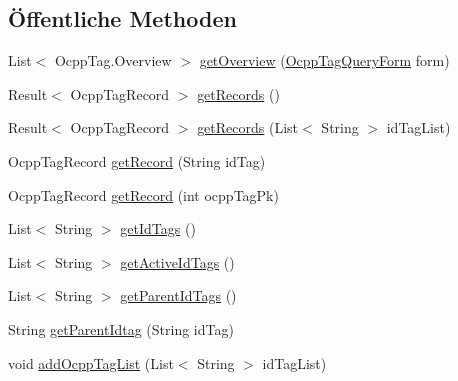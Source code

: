 \subsection*{Öffentliche Methoden}
\begin{DoxyCompactItemize}
\item 
List$<$ Ocpp\+Tag.\+Overview $>$ \hyperlink{interfacede_1_1rwth_1_1idsg_1_1steve_1_1repository_1_1_ocpp_tag_repository_ae80c63f91fbc5c911f0ea3a939406285}{get\+Overview} (\hyperlink{classde_1_1rwth_1_1idsg_1_1steve_1_1web_1_1dto_1_1_ocpp_tag_query_form}{Ocpp\+Tag\+Query\+Form} form)
\item 
Result$<$ Ocpp\+Tag\+Record $>$ \hyperlink{interfacede_1_1rwth_1_1idsg_1_1steve_1_1repository_1_1_ocpp_tag_repository_a3b051f03e81d64f48e5c988a81c86dc7}{get\+Records} ()
\item 
Result$<$ Ocpp\+Tag\+Record $>$ \hyperlink{interfacede_1_1rwth_1_1idsg_1_1steve_1_1repository_1_1_ocpp_tag_repository_aac8b821859efd357c481fab84226f7ca}{get\+Records} (List$<$ String $>$ id\+Tag\+List)
\item 
Ocpp\+Tag\+Record \hyperlink{interfacede_1_1rwth_1_1idsg_1_1steve_1_1repository_1_1_ocpp_tag_repository_a3d218f3abe67946c57af8976c58d206b}{get\+Record} (String id\+Tag)
\item 
Ocpp\+Tag\+Record \hyperlink{interfacede_1_1rwth_1_1idsg_1_1steve_1_1repository_1_1_ocpp_tag_repository_aba9fb2efd7229769c3c198e194eda4dd}{get\+Record} (int ocpp\+Tag\+Pk)
\item 
List$<$ String $>$ \hyperlink{interfacede_1_1rwth_1_1idsg_1_1steve_1_1repository_1_1_ocpp_tag_repository_a7811481285aa81f25bd9bac4445ec0ab}{get\+Id\+Tags} ()
\item 
List$<$ String $>$ \hyperlink{interfacede_1_1rwth_1_1idsg_1_1steve_1_1repository_1_1_ocpp_tag_repository_aeaebdc45f7845e91f98f469197f90f6a}{get\+Active\+Id\+Tags} ()
\item 
List$<$ String $>$ \hyperlink{interfacede_1_1rwth_1_1idsg_1_1steve_1_1repository_1_1_ocpp_tag_repository_a53aa458406fb4dfbbe50e4003e63d00f}{get\+Parent\+Id\+Tags} ()
\item 
String \hyperlink{interfacede_1_1rwth_1_1idsg_1_1steve_1_1repository_1_1_ocpp_tag_repository_a571736e5e6ced39e97f9663ef5bf432f}{get\+Parent\+Idtag} (String id\+Tag)
\item 
void \hyperlink{interfacede_1_1rwth_1_1idsg_1_1steve_1_1repository_1_1_ocpp_tag_repository_a416a281fc1d106c5996e901f7528e013}{add\+Ocpp\+Tag\+List} (List$<$ String $>$ id\+Tag\+List)
\item 

\end{DoxyCompactItemize}
